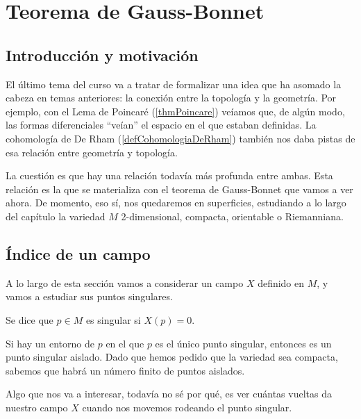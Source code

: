 \chapter{Teorema de Gauss-Bonnet}
\label{chapGaussBonnet}

\section{Introducción y motivación}

El último tema del curso va a tratar de formalizar una idea que ha asomado la cabeza en temas anteriores: la conexión entre la topología y la geometría. Por ejemplo, con el Lema de Poincaré (\ref{thmPoincare}) veíamos que, de algún modo, las formas diferenciales ``veían'' el espacio en el que estaban definidas. La cohomología de De Rham (\ref{defCohomologiaDeRham}) también nos daba pistas de esa relación entre geometría y topología.

La cuestión es que hay una relación todavía más profunda entre ambas. Esta relación es la que se materializa con el teorema de Gauss-Bonnet que vamos a ver ahora. De momento, eso sí, nos quedaremos en superficies, estudiando a lo largo del capítulo la variedad $M$ 2-dimensional, compacta, orientable o Riemanniana.

\section{Índice de un campo}

A lo largo de esta sección vamos a considerar un campo $X$ definido en $M$, y vamos a estudiar sus puntos singulares.

\begin{defn} Se dice que $p∈M$ es singular si $X(p) = 0$. \end{defn}

Si hay un entorno de $p$ en el que $p$ es el único punto singular, entonces es un punto singular aislado. Dado que hemos pedido que la variedad sea compacta, sabemos que habrá un número finito de puntos aislados.

Algo que nos va a interesar, todavía no sé por qué, es ver cuántas vueltas da nuestro campo $X$ cuando nos movemos rodeando el punto singular.

